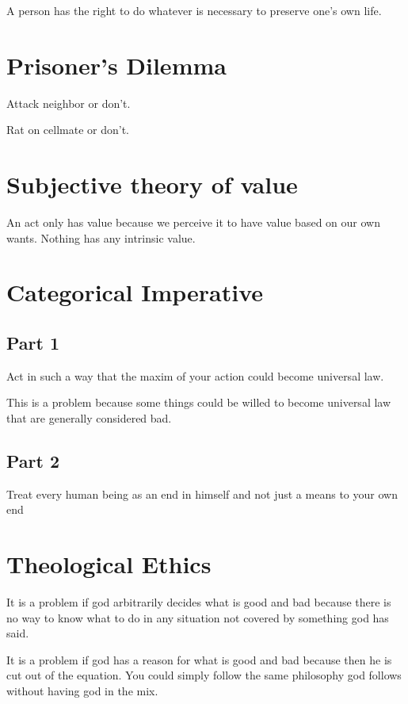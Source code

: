 \documentclass[11pt]{article}
\begin{document}
A person has the right to do whatever is necessary to preserve one's
own life.

\section{Prisoner's Dilemma}
\label{sec-7}

Attack neighbor or don't.

Rat on cellmate or don't.

\section{Subjective theory of value}
\label{sec-8}

An act only has value because we perceive it to have value based on
our own wants. Nothing has any intrinsic value.

\section{Categorical Imperative}
\label{sec-9}

\subsection{Part 1}
\label{sec-9-1}

Act in such a way that the maxim of your action could become universal
law.

This is a problem because some things could be willed to become
universal law that are generally considered bad.

\subsection{Part 2}
\label{sec-9-2}

Treat every human being as an end in himself and not just a means to
your own end

\section{Theological Ethics}
\label{sec-10}

It is a problem if god arbitrarily decides what is good and bad
because there is no way to know what to do in any situation not
covered by something god has said.

It is a problem if god has a reason for what is good and bad because
then he is cut out of the equation. You could simply follow the same
philosophy god follows without having god in the mix.
\end{document}
